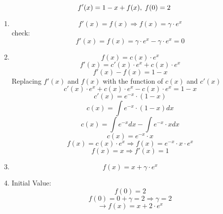 \documentclass{article}
\begin{document}
\begin{equation*} f'(x) = 1 - x + f(x), \hspace{1mm} f(0) = 2 \end{equation*} 
\begin{enumerate} 
    \item {} 
    \begin{equation*}f'(x) = f(x) \Rightarrow f(x) = \gamma \cdot e^{x} \end{equation*}
    check: \begin{equation*} f'(x) = f(x) = \gamma \cdot e^{x} - \gamma \cdot e^{x} = 0 \end{equation*}
    \item {} 
    \begin{equation*} f(x) = c(x) \cdot e^{x} \end{equation*}
    \begin{equation*} f'(x) = c'(x) \cdot e^{x} + c(x) \cdot e^{x} \end{equation*} 
    \begin{equation*} f'(x) - f(x) = 1 - x \end{equation*}  
    Replacing $f'(x)$ and $f(x)$ with the function of $c(x)$ and $c'(x)$
    \begin{equation*} c'(x) \cdot e^{x} + c(x) \cdot e^{x} - c(x) \cdot e^{x} = 1 - x \end{equation*} 
    \begin{equation*}  c'(x) = e^{-x} \cdot (1-x) \end{equation*}
    \begin{equation*}  c(x) = \int e^{-x} \cdot (1-x) dx \end{equation*}
    \begin{equation*}  c(x) = \int e^{-x} dx - \int e^{-x} \cdot x dx \end{equation*}
    \begin{equation*}  c(x) = e^{-x} \cdot x \end{equation*}
 \begin{equation*} f(x) = c(x) \cdot e^{x} \Rightarrow f(x) = e^{-x} \cdot x \cdot e^{x} \end{equation*}
\begin{equation*} f(x) = x \Rightarrow f'(x) = 1 \end{equation*}
    \item {} \newline
          \begin{equation*} f(x) = x + \gamma \cdot e^{x} \end{equation*}
    \item Initial Value: \begin{equation*} f(0) = 2 \end{equation*} 
         \begin{equation*} f(0) = 0 + \gamma = 2 \Rightarrow \gamma = 2 \end{equation*}
         \begin{equation*} \rightarrow  f(x) = x + 2 \cdot e^{x} \end{equation*}
\end{enumerate} 
\end{document}
